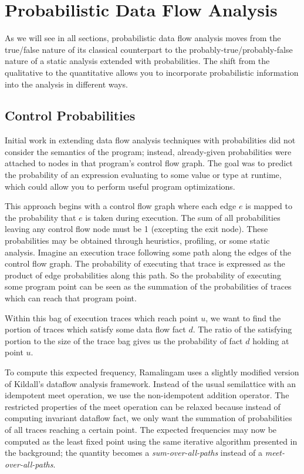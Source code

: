 \section{Probabilistic Data Flow Analysis}
\label{sec:pdfa}

As we will see in all sections, probabilistic data flow
analysis moves from the true/false nature of its classical
counterpart to the probably-true/probably-false nature of
a static analysis extended with probabilities.
The shift from the qualitative to the quantitative allows
you to incorporate probabilistic information into the
analysis in different ways.

\subsection{Control Probabilities}

Initial work in extending data flow analysis 
techniques with probabilities did not consider
the semantics of the program; instead, already-given probabilities 
were attached to nodes in that program's control flow graph.  
The goal was to predict the probability of an expression evaluating 
to some value or type at runtime, which could 
allow you to perform useful program optimizations.

This approach begins with a control flow graph where each edge $e$ is 
mapped to the probability that $e$ is taken during execution.
The sum of all probabilities leaving any control flow node must be 1
(excepting the exit node).
These probabilities may be obtained through heuristics, profiling,
or some static analysis.
Imagine an execution trace following some path along the edges of
the control flow graph.
The probability of executing that trace is expressed as the product of 
edge probabilities along this path.
So the probability of executing some program point can be seen as the
summation of the probabilities of traces which can reach that program
point.


Within this bag of execution traces which reach point $u$, we want to 
find the portion of traces which satisfy some data flow fact $d$.  
The ratio of the satisfying portion to the size of the trace bag
gives us the probability of fact $d$ holding at point $u$.

To compute this expected frequency, Ramalingam uses a slightly
modified version of Kildall's dataflow analysis framework.
Instead of the usual semilattice with an idempotent meet
operation, we use the non-idempotent addition operator.
The restricted properties of the meet operation can be
relaxed because instead of computing invariant dataflow
fact, we only want the summation of probabilities of all
traces reaching a certain point.
The expected frequencies may now be computed as the least
fixed point using the same iterative algorithm presented
in the background; the quantity becomes a
{\sl sum-over-all-paths} instead of a {\sl meet-over-all-paths}.

